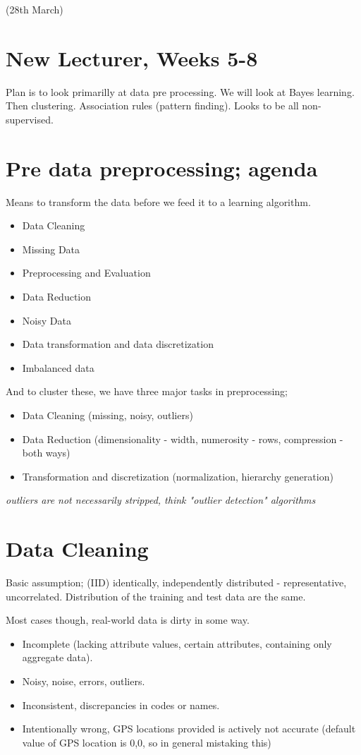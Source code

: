 \documentclass{article}
\begin{document}
(28th March)
\section{New Lecturer, Weeks 5-8}
Plan is to look primarilly at data pre processing. We will look at Bayes learning. Then clustering. Association rules (pattern finding). Looks to be all non-supervised.

\section{Pre data preprocessing; agenda}
Means to transform the data before we feed it to a learning algorithm.

\begin{itemize}
	\item Data Cleaning
	\item Missing Data
	\item Preprocessing and Evaluation
	\item Data Reduction
	\item Noisy Data
	\item Data transformation and data discretization
	\item Imbalanced data
\end{itemize}

And to cluster these, we have three major tasks in preprocessing;

\begin{itemize}
	\item Data Cleaning (missing, noisy, outliers)
	\item Data Reduction (dimensionality - width, numerosity - rows, compression - both ways)
	\item Transformation and discretization (normalization, hierarchy generation)
\end{itemize}

{\em outliers are not necessarily stripped, think "outlier detection" algorithms}

\section{Data Cleaning}
Basic assumption; (IID) identically, independently distributed - representative, uncorrelated. Distribution of the training and test data are the same.

Most cases though, real-world data is dirty in some way.

\begin{itemize}
	\item Incomplete (lacking attribute values, certain attributes, containing only aggregate data).
	\item Noisy, noise, errors, outliers.
	\item Inconsistent, discrepancies in codes or names.
	\item Intentionally wrong, GPS locations provided is actively not accurate (default value of GPS location is 0,0, so in general mistaking this)
\end{itemize}
\end{document}
